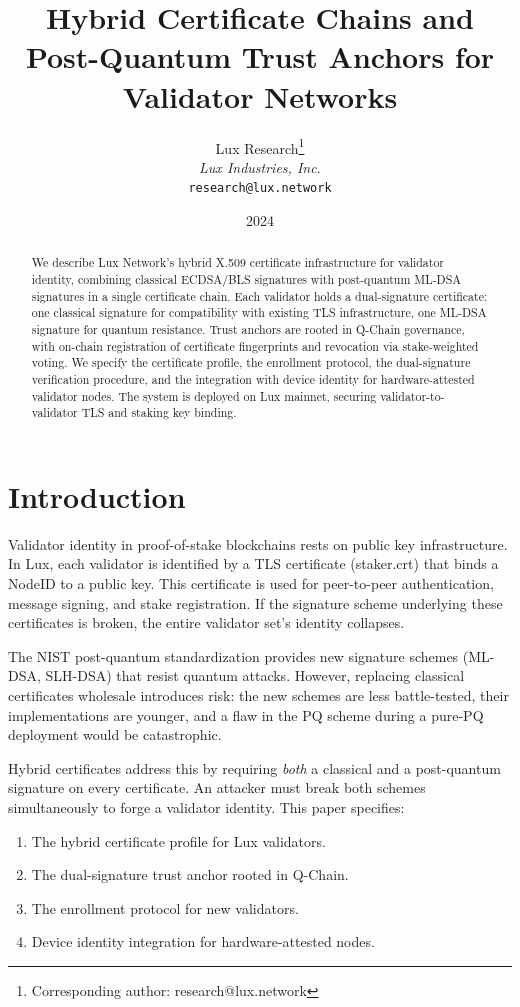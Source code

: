 \documentclass[11pt]{article}
\title{Hybrid Certificate Chains and Post-Quantum Trust Anchors for Validator Networks}
\author{
Lux Research\thanks{Corresponding author: research@lux.network}\\
\textit{Lux Industries, Inc.}\\
\texttt{research@lux.network}
}
\date{2024}
\begin{document}
\luxcoverpage

\begin{abstract}
We describe Lux Network's hybrid X.509 certificate infrastructure for validator identity, combining classical ECDSA/BLS signatures with post-quantum ML-DSA signatures in a single certificate chain. Each validator holds a dual-signature certificate: one classical signature for compatibility with existing TLS infrastructure, one ML-DSA signature for quantum resistance. Trust anchors are rooted in Q-Chain governance, with on-chain registration of certificate fingerprints and revocation via stake-weighted voting. We specify the certificate profile, the enrollment protocol, the dual-signature verification procedure, and the integration with device identity for hardware-attested validator nodes. The system is deployed on Lux mainnet, securing validator-to-validator TLS and staking key binding.
\end{abstract}

\section{Introduction}

Validator identity in proof-of-stake blockchains rests on public key infrastructure. In Lux, each validator is identified by a TLS certificate (staker.crt) that binds a NodeID to a public key. This certificate is used for peer-to-peer authentication, message signing, and stake registration. If the signature scheme underlying these certificates is broken, the entire validator set's identity collapses.

The NIST post-quantum standardization \cite{nist-pqc} provides new signature schemes (ML-DSA, SLH-DSA) that resist quantum attacks. However, replacing classical certificates wholesale introduces risk: the new schemes are less battle-tested, their implementations are younger, and a flaw in the PQ scheme during a pure-PQ deployment would be catastrophic.

Hybrid certificates address this by requiring \emph{both} a classical and a post-quantum signature on every certificate. An attacker must break both schemes simultaneously to forge a validator identity. This paper specifies:
\begin{enumerate}
\item The hybrid certificate profile for Lux validators.
\item The dual-signature trust anchor rooted in Q-Chain.
\item The enrollment protocol for new validators.
\item Device identity integration for hardware-attested nodes.
\end{enumerate}
\end{document}

